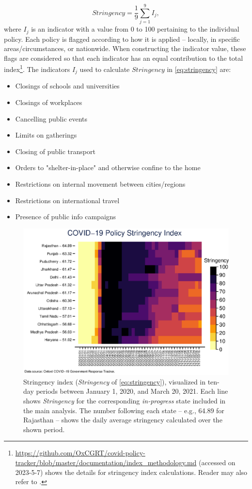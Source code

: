 \documentclass[12pt,a4paper,notitlepage]{article}
\begin{document}
\begin{equation} \label{eq:stringency}
    Stringency = \frac{1}{9} \sum_{j=1}^9 I_j,
\end{equation}
%
where $I_j$ is an indicator with a value from 0 to 100 pertaining to the individual policy. Each policy is flagged according to how it is applied -- locally, in specific areas/circumstances, or nationwide. When constructing the indicator value, these flags are considered so that each indicator has an equal contribution to the total index\footnote{\url{https://github.com/OxCGRT/covid-policy-tracker/blob/master/documentation/index_methodology.md} (accessed on 2023-5-7) shows the details for stringency index calculations. Reader may also refer to \citet{Hale2021}.}. The indicators $I_j$ used to calculate $Stringency$ in \cref{eq:stringency} are:
\begin{itemize}
    \item Closings of schools and universities
    \item Closings of workplaces
    \item Cancelling public events
    \item Limits on gatherings
    \item Closing of public transport
    \item Orders to "shelter-in-place" and otherwise confine to the home
    \item Restrictions on internal movement between cities/regions
    \item Restrictions on international travel
    \item Presence of public info campaigns
\end{itemize}

\begin{figure}
\includegraphics[width=1\linewidth]{images/stringencyIndex.eps}
\caption{\label{fig:stringency} Stringency index (\textit{Stringency} of \cref{eq:stringency}), visualized in ten-day periods between January 1, 2020, and March 20, 2021. Each line shows \textit{Stringency} for the corresponding \textit{in-progress} state included in the main analysis. The number following each state -- e.g., 64.89 for Rajasthan -- shows the daily average stringency calculated over the shown period.}
\end{figure}
\end{document}
